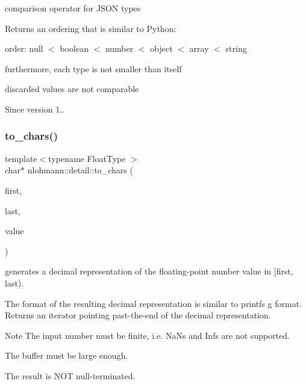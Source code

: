 comparison operator for J\+S\+ON types 

Returns an ordering that is similar to Python\+:
\begin{DoxyItemize}
\item order\+: null $<$ boolean $<$ number $<$ object $<$ array $<$ string
\item furthermore, each type is not smaller than itself
\item discarded values are not comparable
\end{DoxyItemize}

\begin{DoxySince}{Since}
version 1.. 
\end{DoxySince}
\mbox{\label{namespacenlohmann_1_1detail_a18759c536d89c4dd3a118bd3ecb790da}} 
\subsubsection{\texorpdfstring{to\+\_\+chars()}{to\_chars()}}
{\footnotesize\ttfamily template$<$typename Float\+Type $>$ \\
char$\ast$ nlohmann\+::detail\+::to\+\_\+chars (\begin{DoxyParamCaption}\item[{char $\ast$}]{first,  }\item[{const char $\ast$}]{last,  }\item[{Float\+Type}]{value }\end{DoxyParamCaption})}



generates a decimal representation of the floating-\/point number value in \mbox{[}first, last). 

The format of the resulting decimal representation is similar to printf\textquotesingle{}s g format. Returns an iterator pointing past-\/the-\/end of the decimal representation.

\begin{DoxyNote}{Note}
The input number must be finite, i.\+e. NaN\textquotesingle{}s and Inf\textquotesingle{}s are not supported. 

The buffer must be large enough. 

The result is N\+OT null-\/terminated. 
\end{DoxyNote}
